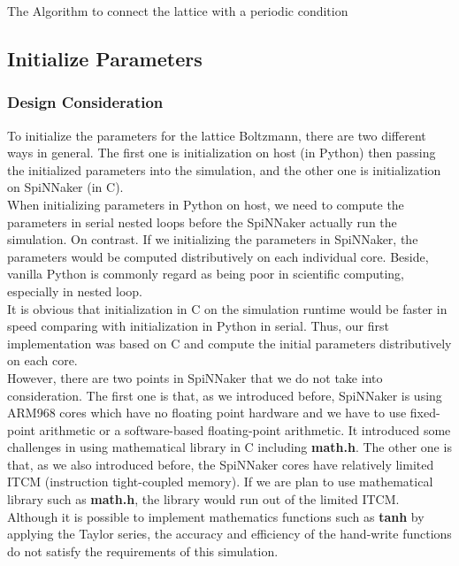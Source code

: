 \begin{algorithm}
 \caption{The Algorithm to connect the lattice with a periodic condition}
 \label{algo:periodic}

\end{algorithm}




\subsection{Initialize Parameters} \label{sec:ip}
\subsubsection{Design Consideration}
To initialize the parameters for the lattice Boltzmann, there are two different ways in general. The first one is initialization on host (in Python) then passing the initialized parameters into the simulation, and the other one is initialization on SpiNNaker (in C).\\

When initializing parameters in Python on host, we need to compute the parameters in serial nested loops before the SpiNNaker actually run the simulation. On contrast. If we initializing the parameters in SpiNNaker, the parameters would be computed distributively on each individual core. Beside, vanilla Python is commonly regard as being poor in scientific computing, especially in nested loop.\\

It is obvious that initialization in C on the simulation runtime would be faster in speed comparing with initialization in Python in serial. Thus, our first implementation was based on C and compute the initial parameters distributively on each core. \\

However, there are two points in SpiNNaker that we do not take into consideration. The first one is that, as we introduced before, SpiNNaker is using ARM968 cores which have no floating point hardware and we have to use fixed-point arithmetic or a software-based floating-point arithmetic. It introduced some challenges in using mathematical library in C including \textbf{math.h}. The other one is that, as we also introduced before, the SpiNNaker cores have relatively limited ITCM (instruction tight-coupled memory). If we are plan to use mathematical library such as \textbf{math.h}, the library would run out of the limited ITCM. Although it is possible to implement mathematics functions such as \textbf{tanh} by applying the Taylor series, the accuracy and efficiency of the hand-write functions do not satisfy the requirements of this simulation.\\


